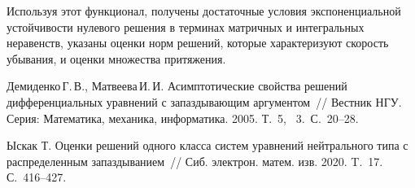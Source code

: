 Используя этот функционал, получены достаточные условия экспоненциальной устойчивости нулевого решения в терминах матричных и интегральных неравенств, указаны оценки норм решений, которые характеризуют скорость убывания, и оценки множества притяжения.  




%

%

\begin{thebibliography}{9} %
 Демиденко\,Г.\,В., Матвеева\,И.\,И.
	 Асимптотические свойства решений дифференциальных уравнений
	с запаздывающим аргументом~//
	Вестник НГУ. Серия: Математика, механика, информатика.
	2005. Т.~5, \textnumero~3.\ С.~20--28.
 

 Ыскак Т.   Оценки решений одного класса систем уравнений нейтрального типа с распределенным запаздыванием~// Сиб. электрон. матем. изв. 2020. T.~17. С.~416--427.


\end{thebibliography}





%

